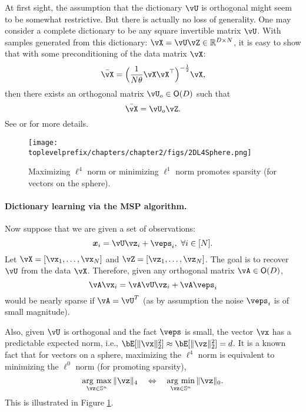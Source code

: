 \documentclass[../../book-main.tex]{subfiles}
\begin{document}
\begin{remark} 
At first sight, the assumption that the dictionary $\vU$ is orthogonal might seem to be somewhat restrictive. But there is actually no loss of generality. One may consider a complete dictionary to be any square invertible matrix $\vU$. With samples generated from this dictionary: $\vX = \vU \vZ \in \mathbb{R}^{D\times N}$, it is easy to show that with some preconditioning of the data matrix $\vX$: 
\begin{equation}
    \bar{\vX} = \Big(\frac{1}{N\theta} \vX\vX^\top\Big)^{-\frac{1}{2}}\vX,
\end{equation}
then there exists an orthogonal matrix $\vU_{o} \in \O(D)$ such that
\begin{equation}
    \bar{\vX} = \vU_{o}\vZ.
\end{equation}
    See  or \cite{sun2017completeI} for more details.
\end{remark}



\begin{figure}
    \centering
    \texttt{[image: \\toplevelprefix/chapters/chapter2/figs/2DL4Sphere.png]}\vspace{-0.1in}
    \caption{Maximizing $\ell^4$ norm or minimizing $\ell^1$ norm promotes sparsity (for vectors on the sphere).}
    \label{fig:L4-sphere}
\end{figure}


\paragraph{Dictionary learning via the MSP algorithm.}

Now suppose that we are given a set of observations:
\begin{equation}
    \x_i = \vU \vz_i + \veps_i,\ \forall i \in [N].
\end{equation}
Let $\vX = [\vx_1, \dots, \vx_N]$ and $\vZ = [\vz_1, \dots, \vz_N]$. The goal is to recover $\vU$ from the data $\vX$. Therefore, given any orthogonal matrix $\vA \in \O(D)$, 
\begin{equation}
    \vA\vx_i = \vA\vU \vz_i + \vA\veps_i
\end{equation}
would be nearly sparse if $\vA = \vU^T$ (as by assumption the noise $\veps_i$ is of small magnitude). 

Also, given $\vU$ is orthogonal and the fact $\veps$ is small, the vector $\vx$ has a predictable expected norm, i.e., $\bE[\norm{\vx}_2^2] \approx \bE[\norm{\vz}_2^2]=d$. It is a known fact that for vectors on a sphere, maximizing the $\ell^4$ norm is equivalent to minimizing the $\ell^0$ norm (for promoting sparsity),
\begin{equation}
    \argmax_{\vz \in \mathbb{S}^n}\|\vz\|_{4}\quad\Leftrightarrow\quad \argmin_{\vz \in \mathbb{S}^n}\|\vz\|_{0}.
\end{equation}
This is illustrated in Figure \ref{fig:L4-sphere}.
\end{document}
